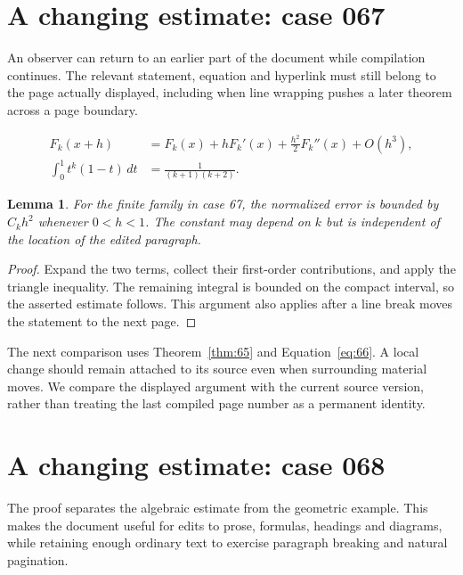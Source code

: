 \documentclass[a4paper,10pt]{article}
\newtheorem{lemma}[theorem]{Lemma}
\begin{document}
\lipsum[3]

\section{A changing estimate: case 067}\label{unit:66}
An observer can return to an earlier part of the document while compilation continues. The relevant statement, equation and hyperlink must still belong to the page actually displayed, including when line wrapping pushes a later theorem across a page boundary.

\lipsum[19-20]
\begin{align}\label{eq:66}
 F_k(x+h)&=F_k(x)+hF_k'(x)+\frac{h^2}{2}F_k''(x)+O(h^3),\\
 \int_0^1 t^k(1-t)\,dt&=\frac{1}{(k+1)(k+2)}.
\end{align}
\begin{lemma}\label{thm:66}
For the finite family in case 67, the normalized error is bounded by $C_k h^2$ whenever $0<h<1$. The constant may depend on $k$ but is independent of the location of the edited paragraph.
\end{lemma}
\begin{proof}
Expand the two terms, collect their first-order contributions, and apply the
triangle inequality. The remaining integral is bounded on the compact interval,
so the asserted estimate follows. This argument also applies after a line break
moves the statement to the next page.
\end{proof}
The next comparison uses Theorem~\ref{thm:65} and Equation~\ref{eq:66}. A local change should remain attached to its source even when surrounding material moves. We compare the displayed argument with the current source version, rather than treating the last compiled page number as a permanent identity.

\lipsum[8]

\section{A changing estimate: case 068}\label{unit:67}
The proof separates the algebraic estimate from the geometric example. This makes the document useful for edits to prose, formulas, headings and diagrams, while retaining enough ordinary text to exercise paragraph breaking and natural pagination.
\end{document}
